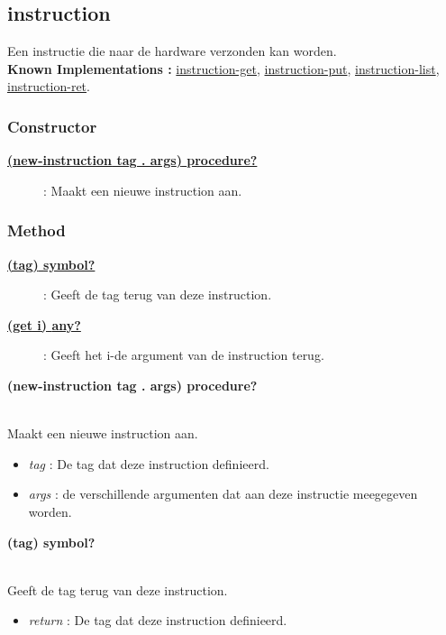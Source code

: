 \documentclass{article}
\newcommand{\ar}{\ding{213} }
\newcommand{\code}[1]{\textcolor{code}{#1}}
\newcommand{\lb}[1][]{\code{(#1}}
\newcommand{\rb}{\code{)}}
\newcommand{\racket}[1]{
	{\color{blue}\textbf{#1}}
}
\begin{document}
\newpage
\hypertarget{instruction}{\subsection{instruction}}
Een instructie die naar de hardware verzonden kan worden.
\\\textbf{Known Implementations :} \hyperlink{instruction-get}{instruction-get}, \hyperlink{instruction-put}{instruction-put}, \hyperlink{instruction-list}{instruction-list}, \hyperlink{instruction-ret}{instruction-ret}.

\subsubsection{Constructor}
\begin{description}
	\item[\hyperlink{instruction:new-instruction}{\racket{\lb[new-instruction] tag . args\rb \ar \code{procedure?}}}] : Maakt een nieuwe instruction aan.
\end{description}

\subsubsection{Method}
\begin{description}
	\item[\hyperlink{instruction:tag}{\racket{\lb[tag]\rb \ar \code{symbol?}}}] : Geeft de tag terug van deze instruction.
	\item[\hyperlink{instruction:get}{\racket{\lb[get] i\rb \ar \code{any?}}}] : Geeft het i-de argument van de instruction terug.
\end{description}

\begin{framed}
	\hypertarget{instruction:new-instruction}{\racket{\lb[new-instruction] tag . args\rb \ar \code{procedure?}}}
	\\Maakt een nieuwe instruction aan.
	\begin{itemize}
		\item \emph{tag} : De tag dat deze instruction definieerd.
		\item \emph{args} : de verschillende argumenten dat aan deze instructie meegegeven worden.
	\end{itemize}
\end{framed}

\begin{framed}
	\hypertarget{instruction:tag}{\racket{\lb[tag]\rb \ar \code{symbol?}}}
	\\Geeft de tag terug van deze instruction.
	\begin{itemize}
		\item \emph{return} : De tag dat deze instruction definieerd.
	\end{itemize}
\end{framed}
\end{document}

